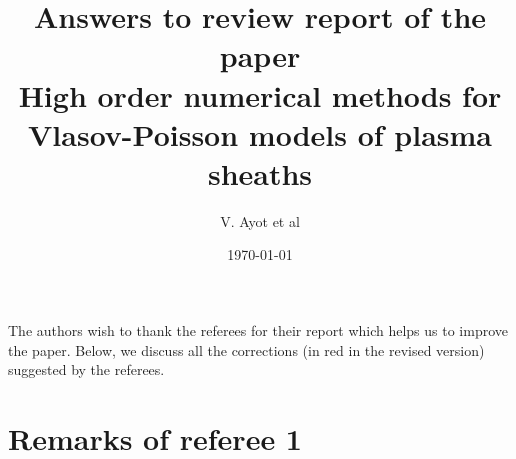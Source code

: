 \documentclass{article}
\title{Answers to review report of the paper\\
\textbf{High order numerical methods for Vlasov-Poisson models of plasma sheaths}}
\author{V. Ayot et al}
\date{\today}
\begin{document}
\maketitle
\Large

The authors  wish to thank the referees for their report which helps us to improve the paper. Below, we discuss all the corrections (in red in the revised version) suggested by the referees.


\section{Remarks of referee 1}
\end{document}
